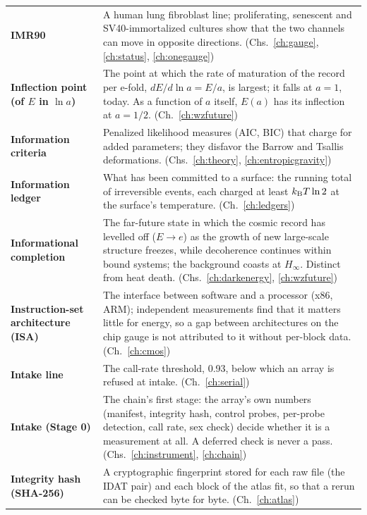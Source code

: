 {\begin{longtable}{@{}>{\raggedright\arraybackslash}p{}>{\raggedright\arraybackslash}p{}@{}}
\textbf{IMR90} & A human lung fibroblast line; proliferating, senescent and SV40-immortalized cultures show that the two channels can move in opposite directions. {\footnotesize(Chs.~\ref{ch:gauge}, \ref{ch:status}, \ref{ch:onegauge})}\\[1pt]
\textbf{Inflection point (of $E$ in $\ln a$)} & The point at which the rate of maturation of the record per e-fold, $dE/d\ln a=E/a$, is largest; it falls at $a=1$, today. As a function of $a$ itself, $E(a)$ has its inflection at $a=1/2$. {\footnotesize(Ch.~\ref{ch:wzfuture})}\\[1pt]
\textbf{Information criteria} & Penalized likelihood measures (AIC, BIC) that charge for added parameters; they disfavor the Barrow and Tsallis deformations. {\footnotesize(Chs.~\ref{ch:theory}, \ref{ch:entropicgravity})}\\[1pt]
\textbf{Information ledger} & What has been committed to a surface: the running total of irreversible events, each charged at least $k_{\mathrm B} T\ln2$ at the surface's temperature. {\footnotesize(Ch.~\ref{ch:ledgers})}\\[1pt]
\textbf{Informational completion} & The far-future state in which the cosmic record has levelled off ($E\to e$) as the growth of new large-scale structure freezes, while decoherence continues within bound systems; the background coasts at $H_\infty$. Distinct from heat death. {\footnotesize(Chs.~\ref{ch:darkenergy}, \ref{ch:wzfuture})}\\[1pt]
\textbf{Instruction-set architecture (ISA)} & The interface between software and a processor (x86, ARM); independent measurements find that it matters little for energy, so a gap between architectures on the chip gauge is not attributed to it without per-block data. {\footnotesize(Ch.~\ref{ch:cmos})}\\[1pt]
\textbf{Intake line} & The call-rate threshold, 0.93, below which an array is refused at intake. {\footnotesize(Ch.~\ref{ch:serial})}\\[1pt]
\textbf{Intake (Stage 0)} & The chain's first stage: the array's own numbers (manifest, integrity hash, control probes, per-probe detection, call rate, sex check) decide whether it is a measurement at all. A deferred check is never a pass. {\footnotesize(Chs.~\ref{ch:instrument}, \ref{ch:chain})}\\[1pt]
\textbf{Integrity hash (SHA-256)} & A cryptographic fingerprint stored for each raw file (the IDAT pair) and each block of the atlas fit, so that a rerun can be checked byte for byte. {\footnotesize(Ch.~\ref{ch:atlas})}\\[1pt]

\end{longtable}}
